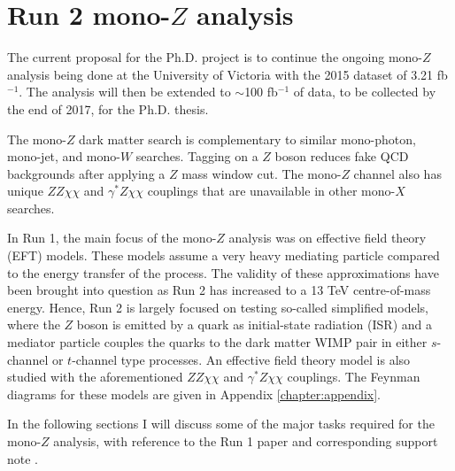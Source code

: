 \section{Run 2 mono-$Z$ analysis}
\label{sec:monoZ}

The current proposal for the Ph.D. project is to continue the ongoing mono-$Z$ analysis being done at the University of Victoria with the 2015 dataset of 3.21 fb$^{-1}$. The analysis will then be extended to $\sim$100 fb$^{-1}$ of data, to be collected by the end of 2017, for the Ph.D. thesis.

The mono-$Z$ dark matter search is complementary to similar mono-photon, mono-jet, and mono-$W$ searches. Tagging on a $Z$ boson reduces fake QCD backgrounds after applying a $Z$ mass window cut. The mono-$Z$ channel also has unique $ZZ\chi\chi$ and $\gamma^*Z\chi\chi$ couplings that are unavailable in other mono-$X$ searches. 

In Run 1, the main focus of the mono-$Z$ analysis was on effective field theory (EFT) models. These models assume a very heavy mediating particle compared to the energy transfer of the process. The validity of these approximations have been brought into question as Run 2 has increased to a 13 TeV centre-of-mass energy. Hence, Run 2 is largely focused on testing so-called simplified models, where the $Z$ boson is emitted by a quark as initial-state radiation (ISR) and a mediator particle couples the quarks to the dark matter WIMP pair in either $s$-channel or $t$-channel type processes. An effective field theory model is also studied with the aforementioned $ZZ\chi\chi$ and $\gamma^*Z\chi\chi$ couplings. The Feynman diagrams for these models are given in Appendix \ref{chapter:appendix}.

In the following sections I will discuss some of the major tasks required for the mono-$Z$ analysis, with reference to the Run 1 paper \cite{Aad:2014vka} and corresponding support note \cite{Barberio:1529950}.